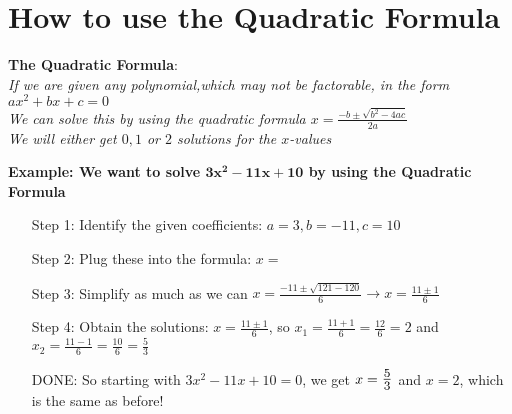 \documentclass[12pt]{article}
\begin{document}
\noindent
\section*{How to use the Quadratic Formula}

\begin{tcolorbox}[
    width=\linewidth,
    colframe=black,         %
    colback=white,          %
    boxrule=0.5pt,          %
    left=1mm, right=1.1mm,    %
    top=1mm, bottom=1mm,    %
    arc=2mm                 %
]
\textbf{The Quadratic Formula}: \\
\textit{If we are given any polynomial,which may not be factorable, in the form $ax^2+bx+c=0$\\
We can solve this by using the quadratic formula
$x = \displaystyle\frac{-b \pm \sqrt{b^2 - 4ac}}{2a}$ \\
We will either get $0,1$ or $2$ solutions for the $x$-values}
\end{tcolorbox}
\noindent
    \textbf{Example: We want to solve $\mathbf{3x^2-11x+10}$ by using the Quadratic Formula}
\begin{enumerate}[
    leftmargin=1.75cm,
    labelsep=0pt,
    font=\bfseries
    ]
    \renewcommand{\labelenumi}{}

    \item[Step 1: ] Identify the given coefficients: $a=3, b=-11, c=10$
    \item[Step 2: ]  Plug these into the formula: $x = $
    \item[Step 3: ]  Simplify as much as we can $x = \displaystyle\frac{-11 \pm \sqrt{121-120}}{6} \longrightarrow x = \displaystyle\frac{11 \pm 1}{6}$
    \item[Step 4: ]  Obtain the solutions: $x = \displaystyle\frac{11 \pm 1}{6}$, so
    $x_1 = \displaystyle\frac{11 + 1}{6} = \displaystyle\frac{12}{6} = 2$ and $x_2 = \displaystyle\frac{11 - 1}{6} = \displaystyle\frac{10}{6} = \frac{5}{3}$
    \item[DONE: ]  So starting with $3x^2-11x+10=0$, we get $x=\scalebox{1.25}{$\frac{5}{3}$}$ and $x=2$, which is the same as before!
    \end{enumerate}
\end{document}
